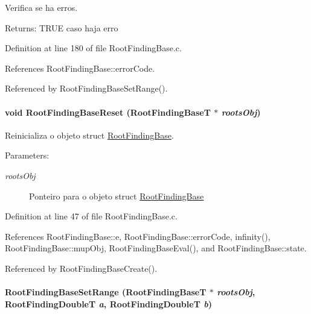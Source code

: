 Verifica se ha erros. 

\begin{Desc}
\item[Returns:]TRUE caso haja erro \end{Desc}


Definition at line 180 of file RootFindingBase.c.

References RootFindingBase::errorCode.

Referenced by RootFindingBaseSetRange().\hypertarget{group____roots_gafb0a57a39081653e224b3b7e95774f0}{
\paragraph[RootFindingBaseReset]{\setlength{\rightskip}{0pt plus 5cm}void RootFindingBaseReset ({\bf RootFindingBaseT} $\ast$ {\em rootsObj})}\hfill}
\label{group____roots_gafb0a57a39081653e224b3b7e95774f0}


Reinicializa o objeto struct \hyperlink{structRootFindingBase}{RootFindingBase}. 

\begin{Desc}
\item[Parameters:]
\begin{description}
\item[{\em rootsObj}]Ponteiro para o objeto struct \hyperlink{structRootFindingBase}{RootFindingBase} \end{description}
\end{Desc}


Definition at line 47 of file RootFindingBase.c.

References RootFindingBase::e, RootFindingBase::errorCode, infinity(), RootFindingBase::mupObj, RootFindingBaseEval(), and RootFindingBase::state.

Referenced by RootFindingBaseCreate().\hypertarget{group____roots_g66563d156c9a25a8316a9c557e0bf7b8}{
\paragraph[RootFindingBaseSetRange]{ RootFindingBaseSetRange ({\bf RootFindingBaseT} $\ast$ {\em rootsObj}, \/  {\bf RootFindingDoubleT} {\em a}, \/  {\bf RootFindingDoubleT} {\em b})}\hfill}
\label{group____roots_g66563d156c9a25a8316a9c557e0bf7b8}


